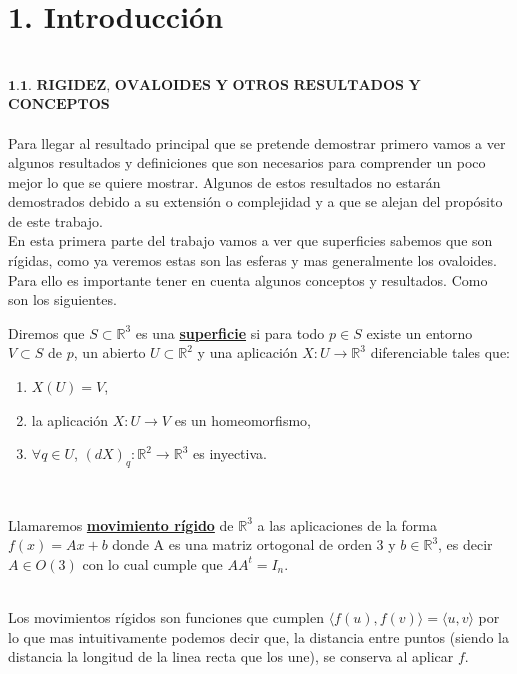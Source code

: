 \chapter*{1. Introducción}


${ }$\\
$\textbf{1.1. RIGIDEZ, OVALOIDES Y OTROS RESULTADOS Y}$
${ }$\\
	$\textbf{CONCEPTOS}$
${ }$\\
${ }$\\

Para llegar al resultado principal que se pretende demostrar primero vamos a ver algunos resultados y definiciones que son necesarios para comprender un poco mejor lo que se quiere mostrar. Algunos de estos resultados no estarán demostrados debido a su extensión o complejidad y a que se alejan del propósito de este trabajo.
${ }$\\

En esta primera parte del trabajo vamos a ver que superficies sabemos que son rígidas, como ya veremos estas son las esferas y mas generalmente los ovaloides. Para ello es importante tener en cuenta algunos conceptos y resultados. Como son los siguientes.
${ }$\\

\begin{definicion}
	Diremos que $S \subset \mathbb{R}^3$ es una \underline{\textbf{superficie}} si para todo $p \in S$ existe un entorno $V \subset S$ de $p$, un abierto $U \subset \mathbb{R}^2$ y una aplicación $X : U \to \mathbb{R}^3$ diferenciable tales que:
	\begin{enumerate}
		\item $X(U) = V$,
		\item la aplicación $X : U \to V$ es un homeomorfismo,
		\item $\forall q \in U$, $(dX)_q : \mathbb{R}^2 \to \mathbb{R}^3$ es inyectiva.
	\end{enumerate}
\end{definicion}
${ }$\\

\begin{definicion}
	Llamaremos \underline{\textbf{movimiento rígido}} de $\mathbb{R}^3$ a las aplicaciones de la forma $f(x) = Ax + b$ donde A es una matriz ortogonal de orden 3 y $b \in \mathbb{R}^3$, es decir $A \in O(3)$ con lo cual cumple que $AA^{t} = I_{n}$.
\end{definicion}
${ }$\\

Los movimientos rígidos son funciones que cumplen $\langle f(u), f(v) \rangle = \langle u, v \rangle$ por lo que mas intuitivamente podemos decir que, la distancia entre puntos (siendo la distancia la longitud de la linea recta que los une), se conserva al aplicar $f$.
${ }$\\

